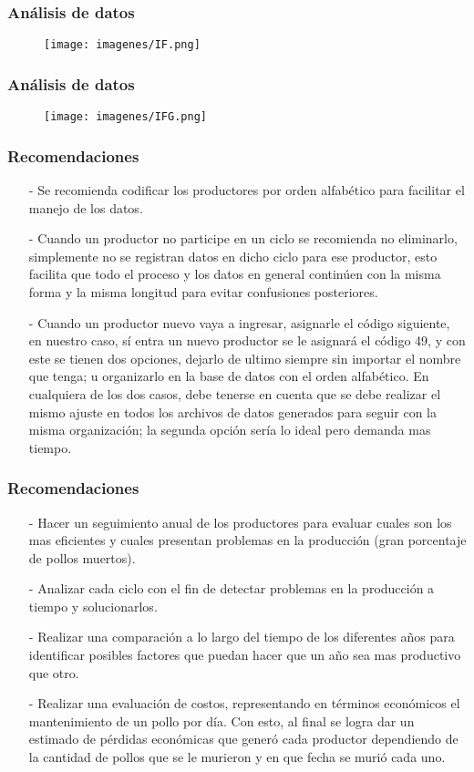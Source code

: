 \documentclass[11pt]{beamer}
\begin{document}
\begin{frame}
\frametitle{Análisis de datos}
\begin{figure}[!h]
        \texttt{[image: imagenes/IF.png]}
        \label{figura1}
\end{figure}
\end{frame}

\begin{frame}
\frametitle{Análisis de datos}
\begin{figure}[!h]
        \texttt{[image: imagenes/IFG.png]}
        \label{figura1}
\end{figure}
\end{frame}

\begin{frame}
\frametitle{Recomendaciones}
\begin{itemize}
\justifying
\item[-]Se recomienda codificar los productores por orden alfabético para facilitar el manejo de los datos.
\item[-]Cuando un productor no participe en un ciclo se recomienda no eliminarlo, simplemente no se registran datos en dicho ciclo para ese productor, esto facilita que todo el proceso y los datos en general continúen con la misma forma y la misma longitud para evitar confusiones posteriores.
\item[-]Cuando un productor nuevo vaya a ingresar, asignarle el código siguiente, en nuestro caso, sí entra un nuevo productor se le asignará el código 49, y con este se tienen dos opciones, dejarlo de ultimo siempre sin importar el nombre que tenga; u organizarlo en la base de datos con el orden alfabético. En cualquiera de los dos casos, debe tenerse en cuenta que se debe realizar el mismo ajuste en todos los archivos de datos generados para seguir con la misma organización; la segunda opción sería lo ideal pero demanda mas tiempo.
\end{itemize}
\end{frame}

\begin{frame}
\frametitle{Recomendaciones}
\begin{itemize}
\justifying
\item[-]Hacer un seguimiento anual de los productores para evaluar cuales son los mas eficientes y cuales presentan problemas en la producción (gran porcentaje de pollos muertos).
\item[-]Analizar cada ciclo con el fin de detectar problemas en la producción a tiempo y solucionarlos.
\item[-]Realizar una comparación a lo largo del tiempo de los diferentes años para identificar posibles factores que puedan hacer que un año sea mas productivo que otro.
\item[-]Realizar una evaluación de costos, representando en términos económicos el mantenimiento de un pollo por día. Con esto, al final se logra dar un estimado de pérdidas económicas que generó cada productor dependiendo de la cantidad de pollos que se le murieron y en que fecha se murió cada uno.
\end{itemize}
\end{frame}
\end{document}
